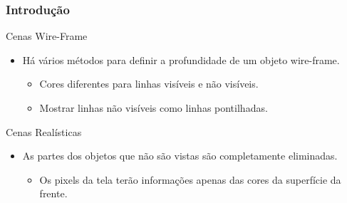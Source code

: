\documentclass{beamer}
\begin{document}
\begin{frame}
\frametitle{Introdução}


	\begin{block}{Cenas Wire-Frame}
		\begin{itemize}
			\item Há vários métodos para definir a profundidade de um objeto wire-frame.
			\begin{itemize}
				\item Cores diferentes para linhas visíveis e não visíveis.
				\item Mostrar linhas não visíveis como linhas pontilhadas.
			\end{itemize}
		\end{itemize}
	\end{block}
	
	\begin{block}{Cenas Realísticas}
		\begin{itemize}
			\item As partes dos objetos que não são vistas são completamente eliminadas.
			\begin{itemize}
				\item Os pixels da tela terão informações apenas das cores da superfície da frente.
			\end{itemize}
		\end{itemize}
	\end{block}
\end{frame}
\end{document}

